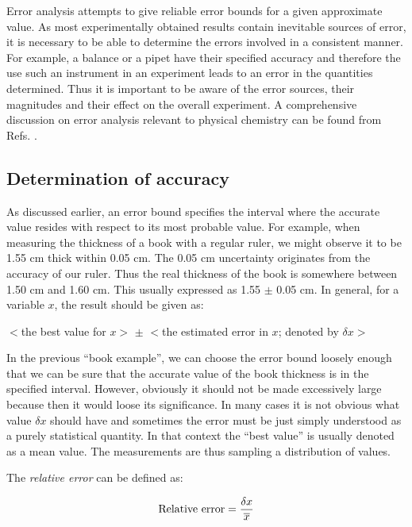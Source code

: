 \documentclass[byrevtex,amssymb,aps,pra,floatfix,letterpaper]{revtex4}
\begin{document}
Error analysis attempts to give reliable error bounds for a given approximate value. As most experimentally obtained results contain inevitable sources of error, it is necessary to be able to determine the errors involved in a consistent manner. For example, a balance or a pipet have their specified accuracy and therefore the use such an instrument in an experiment leads to an error in the quantities determined. Thus it is important to be aware of the error sources, their magnitudes and their effect on the overall experiment. A comprehensive discussion on error analysis relevant to physical chemistry can be found from Refs. \cite{MCBANE,TAYLOR}.

\subsection{Determination of accuracy}

As discussed earlier, an error bound specifies the interval where the accurate value resides with respect to its most probable value. For example, when measuring the thickness of a book with a regular ruler, we might observe it to be 1.55 cm thick within 0.05 cm. The 0.05 cm uncertainty originates from the accuracy of our ruler. Thus the real thickness of the book is somewhere between 1.50 cm and 1.60 cm. This usually expressed as 1.55 $\pm$ 0.05 cm. In general, for a variable $x$, the result should be given as:

\begin{center}
$<$the best value for $x>$ $\pm$ $<$the estimated error in $x$; denoted by $\delta x>$
\end{center}

\noindent
In the previous ``book example'', we can choose the error bound loosely enough that we can be
sure that the accurate value of the book thickness is in the specified interval. However, obviously
it should not be made excessively large because then it would loose its significance. In many
cases it is not obvious what value $\delta x$ should have and sometimes the error must be just simply
understood as a purely statistical quantity. In that context the ``best value'' is usually denoted as a
mean value. The measurements are thus sampling a distribution of values.

The \textit{relative error} can be defined as:

\begin{equation}
\label{eq1}
\textnormal{Relative error} = \frac{\delta x}{\overline{x}}
\end{equation}
\end{document}
